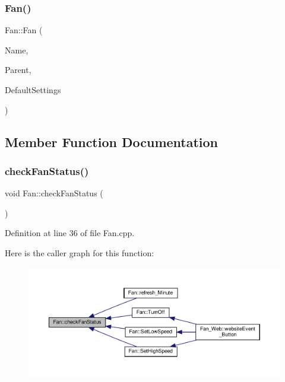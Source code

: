 \subsubsection{\texorpdfstring{Fan()}{Fan()}\hspace{0.1cm}{\footnotesize\ttfamily [2/2]}}
{\footnotesize\ttfamily Fan\+::\+Fan (\begin{DoxyParamCaption}\item[{const \+\_\+\+\_\+\+Flash\+String\+Helper $\ast$}]{Name,  }\item[{\hyperlink{class_module}{Module} $\ast$}]{Parent,  }\item[{\hyperlink{struct_settings_1_1_fan_settings}{Settings\+::\+Fan\+Settings} $\ast$}]{Default\+Settings }\end{DoxyParamCaption})}



\subsection{Member Function Documentation}
\mbox{\label{class_fan_a32c99a0575098a2600ea3c9f27013a98}} 
\subsubsection{\texorpdfstring{check\+Fan\+Status()}{checkFanStatus()}\hspace{0.1cm}{\footnotesize\ttfamily [1/2]}}
{\footnotesize\ttfamily void Fan\+::check\+Fan\+Status (\begin{DoxyParamCaption}{ }\end{DoxyParamCaption})\hspace{0.3cm}{\ttfamily [protected]}}



Definition at line 36 of file Fan.\+cpp.

Here is the caller graph for this function\+:
\nopagebreak
\begin{figure}[H]
\begin{center}
\leavevmode
\includegraphics[width=350pt]{class_fan_a32c99a0575098a2600ea3c9f27013a98_icgraph}
\end{center}
\end{figure}
\mbox{\label{class_fan_a32c99a0575098a2600ea3c9f27013a98}} 
